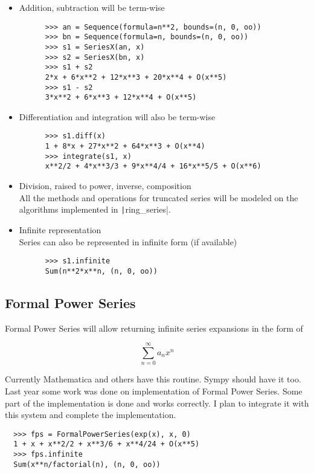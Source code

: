 \documentclass[a4paper,12pt]{article}
\newcommand{\pyline}[1]{\texttt|#1|}
\begin{document}
\begin{itemize}
  \item Addition, subtraction will be term-wise\hfill
    \begin{verbatim}
      >>> an = Sequence(formula=n**2, bounds=(n, 0, oo))
      >>> bn = Sequence(formula=n, bounds=(n, 0, oo))
      >>> s1 = SeriesX(an, x)
      >>> s2 = SeriesX(bn, x)
      >>> s1 + s2
      2*x + 6*x**2 + 12*x**3 + 20*x**4 + O(x**5)
      >>> s1 - s2
      3*x**2 + 6*x**3 + 12*x**4 + O(x**5)
    \end{verbatim}
  \item Differentiation and integration will also be term-wise\hfill
    \begin{verbatim}
      >>> s1.diff(x)
      1 + 8*x + 27*x**2 + 64*x**3 + O(x**4)
      >>> integrate(s1, x)
      x**2/2 + 4*x**3/3 + 9*x**4/4 + 16*x**5/5 + O(x**6)
    \end{verbatim}
  \item Division, raised to power, inverse, composition\hfill\\
    All the methods and operations for truncated series will be modeled
    on the algorithms implemented in \pyline{ring_series}\cite{ring}.
  \item Infinite representation\hfill\\
    Series can also be represented in infinite form (if available)
    \begin{verbatim}
      >>> s1.infinite
      Sum(n**2*x**n, (n, 0, oo))
    \end{verbatim}
\end{itemize}

\subsection{Formal Power Series}

Formal Power Series will allow returning infinite series expansions in
the form of

$$\sum\limits_{n=0}^\infty a_n x^n$$

Currently Mathematica and others have this routine. Sympy should have
it too. Last year some work was done on implementation of Formal Power Series\cite{fps1}\cite{fps2}. 
Some part of the implementation is done and works correctly. I plan to integrate it with this system and complete the implementation.

\begin{verbatim}
  >>> fps = FormalPowerSeries(exp(x), x, 0)
  1 + x + x**2/2 + x**3/6 + x**4/24 + O(x**5)
  >>> fps.infinite
  Sum(x**n/factorial(n), (n, 0, oo))
\end{verbatim}
\end{document}
